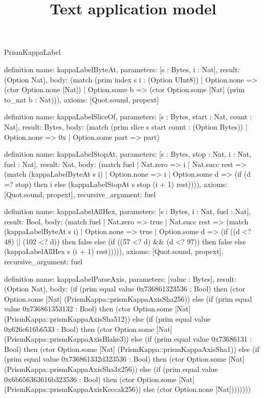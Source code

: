 \begin{lexlean}{PrismKappaLabel}
\title{Text application model}
\begin{semanticmodule}
definition{
  name: kappaLabelByteAt,
  parameters: [s : Bytes, i : Nat],
  result: (Option Nat),
  body: (match (prim index s i : (Option UInt8))
    | Option.none => (ctor Option.none [Nat])
    | Option.some b => (ctor Option.some [Nat] (prim to_nat b : Nat))),
  axioms: [Quot.sound, propext]
}

definition{
  name: kappaLabelSliceOf,
  parameters: [s : Bytes, start : Nat, count : Nat],
  result: Bytes,
  body: (match (prim slice s start count : (Option Bytes))
    | Option.none => 0x
    | Option.some part => part)
}

definition{
  name: kappaLabelStopAt,
  parameters: [s : Bytes, stop : Nat, i : Nat, fuel : Nat],
  result: Nat,
  body: (match fuel
    | Nat.zero => i
    | Nat.succ rest => (match (kappaLabelByteAt s i)
      | Option.none => i
      | Option.some d => (if (d =? stop) then i else (kappaLabelStopAt s stop (i + 1) rest)))),
  axioms: [Quot.sound, propext],
  recursive_argument: fuel
}

definition{
  name: kappaLabelAllHex,
  parameters: [s : Bytes, i : Nat, fuel : Nat],
  result: Bool,
  body: (match fuel
    | Nat.zero => true
    | Nat.succ rest => (match (kappaLabelByteAt s i)
      | Option.none => true
      | Option.some d => (if ((d <? 48) || (102 <? d)) then false else (if ((57 <? d) && (d <? 97)) then false else (kappaLabelAllHex s (i + 1) rest))))),
  axioms: [Quot.sound, propext],
  recursive_argument: fuel
}

definition{
  name: kappaLabelParseAxis,
  parameters: [value : Bytes],
  result: (Option Nat),
  body: (if (prim equal value 0x736861323536 : Bool) then (ctor Option.some [Nat] (PrismKappa::prismKappaAxisSha256)) else (if (prim equal value 0x736861353132 : Bool) then (ctor Option.some [Nat] (PrismKappa::prismKappaAxisSha512)) else (if (prim equal value 0x626c616b6533 : Bool) then (ctor Option.some [Nat] (PrismKappa::prismKappaAxisBlake3)) else (if (prim equal value 0x73686131 : Bool) then (ctor Option.some [Nat] (PrismKappa::prismKappaAxisSha1)) else (if (prim equal value 0x736861332d323536 : Bool) then (ctor Option.some [Nat] (PrismKappa::prismKappaAxisSha3x256)) else (if (prim equal value 0x6b656363616b323536 : Bool) then (ctor Option.some [Nat] (PrismKappa::prismKappaAxisKeccak256)) else (ctor Option.none [Nat])))))))
}


\end{semanticmodule}
\end{lexlean}
